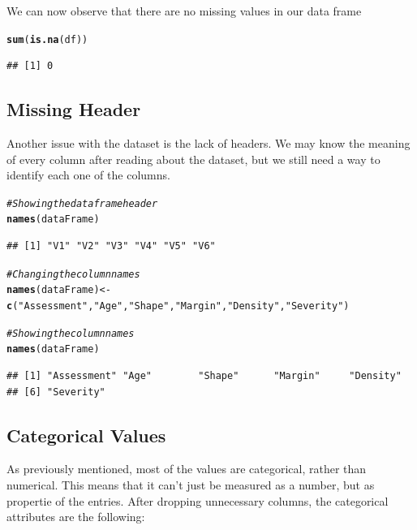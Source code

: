 \documentclass[a4paper,12pt]{article}\usepackage[]{graphicx}\usepackage[]{color}
\makeatletter
\newcommand{\hlstr}[1]{\textcolor[rgb]{0.192,0.494,0.8}{#1}}%
\newcommand{\hlcom}[1]{\textcolor[rgb]{0.678,0.584,0.686}{\textit{#1}}}%
\newcommand{\hlstd}[1]{\textcolor[rgb]{0.345,0.345,0.345}{#1}}%
\newcommand{\hlkwb}[1]{\textcolor[rgb]{0.69,0.353,0.396}{#1}}%
\newcommand{\hlkwd}[1]{\textcolor[rgb]{0.737,0.353,0.396}{\textbf{#1}}}%
\newenvironment{kframe}{%
 \def\at@end@of@kframe{}%
 \ifinner\ifhmode%
  \def\at@end@of@kframe{\end{minipage}}%
  \begin{minipage}{\columnwidth}%
 \fi\fi%
 \def\FrameCommand##1{\hskip\@totalleftmargin \hskip-\fboxsep
 \colorbox{shadecolor}{##1}\hskip-\fboxsep
     \hskip-\linewidth \hskip-\@totalleftmargin \hskip\columnwidth}%
 \MakeFramed {\advance\hsize-\width
   \@totalleftmargin\z@ \linewidth\hsize
   \@setminipage}}%
 {\par\unskip\endMakeFramed%
 \at@end@of@kframe}
\newenvironment{knitrout}{}{} %
\makeatother
\begin{document}
We can now observe that there are no missing values in our data frame

\begin{knitrout}
\color{fgcolor}\begin{kframe}
\begin{alltt}
\hlkwd{sum}\hlstd{(}\hlkwd{is.na}\hlstd{(df))}
\end{alltt}
\begin{verbatim}
## [1] 0
\end{verbatim}
\end{kframe}
\end{knitrout}

\clearpage

\subsection{Missing Header}\label{missing_header}
Another issue with the dataset is the lack of headers. We may know the meaning of every column after reading about the dataset, but we still need a way to identify each one of the columns.

\begin{knitrout}
\color{fgcolor}\begin{kframe}
\begin{alltt}
\hlcom{# Showing the data frame header}
\hlkwd{names}\hlstd{(dataFrame)}
\end{alltt}
\begin{verbatim}
## [1] "V1" "V2" "V3" "V4" "V5" "V6"
\end{verbatim}
\begin{alltt}
\hlcom{# Changing the column names}
\hlkwd{names}\hlstd{(dataFrame)} \hlkwb{<-} \hlkwd{c}\hlstd{(}\hlstr{"Assessment"}\hlstd{,}\hlstr{"Age"}\hlstd{,}\hlstr{"Shape"}\hlstd{,}\hlstr{"Margin"}\hlstd{,}\hlstr{"Density"}\hlstd{,} \hlstr{"Severity"}\hlstd{)}

\hlcom{# Showing the column names}
\hlkwd{names}\hlstd{(dataFrame)}
\end{alltt}
\begin{verbatim}
## [1] "Assessment" "Age"        "Shape"      "Margin"     "Density"   
## [6] "Severity"
\end{verbatim}
\end{kframe}
\end{knitrout}

\subsection{Categorical Values}\label{categorical_values}
As previously mentioned, most of the values are categorical, rather than numerical. This means that it can't just be measured as a number, but as propertie of the entries. After dropping unnecessary columns, the categorical attributes are the following:
\end{document}

